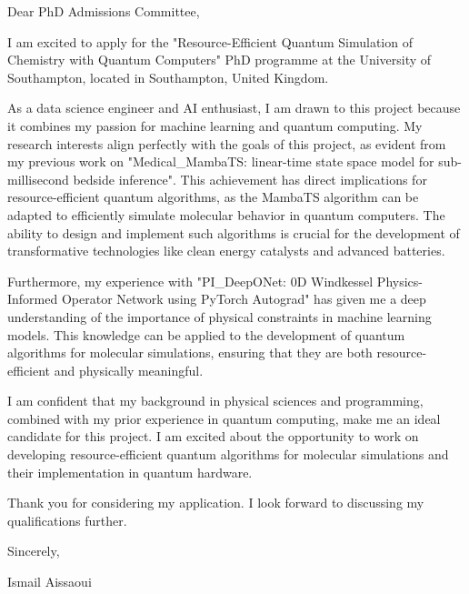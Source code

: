 \documentclass[10pt]{letter}
\begin{document}
\opening{}

Dear PhD Admissions Committee,

I am excited to apply for the "Resource-Efficient Quantum Simulation of Chemistry with Quantum Computers" PhD programme at the University of Southampton, located in Southampton, United Kingdom.

As a data science engineer and AI enthusiast, I am drawn to this project because it combines my passion for machine learning and quantum computing. My research interests align perfectly with the goals of this project, as evident from my previous work on "Medical_MambaTS: linear-time state space model for sub-millisecond bedside inference". This achievement has direct implications for resource-efficient quantum algorithms, as the MambaTS algorithm can be adapted to efficiently simulate molecular behavior in quantum computers. The ability to design and implement such algorithms is crucial for the development of transformative technologies like clean energy catalysts and advanced batteries.

Furthermore, my experience with "PI_DeepONet: 0D Windkessel Physics-Informed Operator Network using PyTorch Autograd" has given me a deep understanding of the importance of physical constraints in machine learning models. This knowledge can be applied to the development of quantum algorithms for molecular simulations, ensuring that they are both resource-efficient and physically meaningful.

I am confident that my background in physical sciences and programming, combined with my prior experience in quantum computing, make me an ideal candidate for this project. I am excited about the opportunity to work on developing resource-efficient quantum algorithms for molecular simulations and their implementation in quantum hardware.

Thank you for considering my application. I look forward to discussing my qualifications further.

Sincerely,

Ismail Aissaoui

\closing{}
\end{document}
